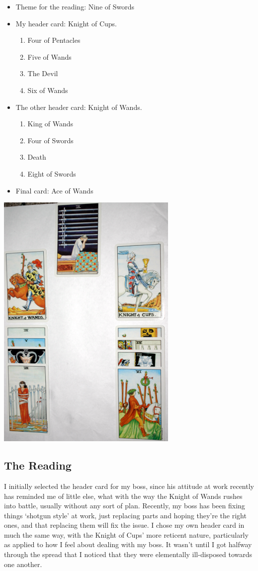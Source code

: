 \begin{itemize}
  \item Theme for the reading: Nine of Swords
  \item My header card: Knight of Cups.
  \begin{enumerate}
    \item Four of Pentacles
    \item Five of Wands
    \item The Devil
    \item Six of Wands
  \end{enumerate}
  \item The other header card: Knight of Wands.
  \begin{enumerate}
    \item King of Wands
    \item Four of Swords
    \item Death
    \item Eight of Swords
  \end{enumerate}
  \item Final card: Ace of Wands
\end{itemize}
\includegraphics{image8-17-08.png}

\subsection*{The Reading}
I initially selected the header card for my boss, since his attitude at
work recently has reminded me of little else, what with the way the
Knight of Wands rushes into battle, usually without any sort of plan.
Recently, my boss has been fixing things `shotgun style' at work, just
replacing parts and hoping they're the right ones, and that replacing
them will fix the issue.  I chose my own header card in much the same
way, with the Knight of Cups' more reticent nature, particularly as
applied to how I feel about dealing with my boss.  It wasn't until I got
halfway through the spread that I noticed that they were elementally
ill-disposed towards one another.

